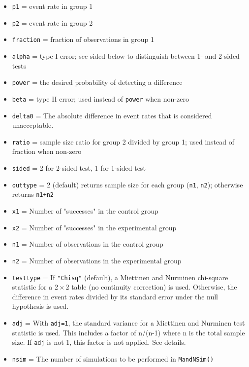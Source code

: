 \bigskip

\begin{itemize}
\item \texttt{p1} = event rate in group 1

\item \texttt{p2} = event rate in group 2

\item \texttt{fraction} = fraction of observations in group 1

\item \texttt{alpha} = type I error; see sided below to distinguish between
1- and 2-sided tests

\item \texttt{power} = the desired probability of detecting a difference

\item \texttt{beta} = type II error; used instead of \texttt{power} when non-zero

\item \texttt{delta0} = The absolute difference in event rates that is
considered unacceptable.

\item \texttt{ratio} = sample size ratio for group 2 divided by group 1; used
instead of fraction when non-zero

\item \texttt{sided} = 2 for 2-sided test, 1 for 1-sided test

\item \texttt{outtype} = 2 (default) returns sample size for each group
(\texttt{n1}, \texttt{n2}); otherwise returns \texttt{n1+n2}

\item \texttt{x1} = Number of "successes" in the control group

\item \texttt{x2} = Number of "successes" in the experimental group

\item \texttt{n1} = Number of observations in the control group

\item \texttt{n2} = Number of observations in the experimental group

\item \texttt{testtype} =  
If \texttt{"Chisq"} (default), a Miettinen and
Nurminen chi-square statistic for a $2 \times 2$ table (no continuity 
correction) is used. Otherwise, the difference in event rates divided by its 
standard error under the null hypothesis is used.

\item \texttt{adj} = 
With \texttt{adj=1}, the standard variance for a
Miettinen and Nurminen test statistic is used. This includes a factor of
n/(n-1) where n is the total sample size. If \texttt{adj} is not 1, this
factor is not applied. See details.%

\item \texttt{nsim} = The number of simulations to be performed in
\texttt{MandNSim()}
\end{itemize}

